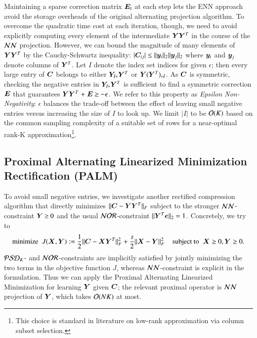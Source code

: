 Maintaining a sparse correction matrix $\bm{E}_t$ at each step lets the ENN
approach avoid the storage overheads of the original alternating projection
algorithm.  To overcome the quadratic time cost at each iteration, though, we
need to avoid explicitly computing every element of the intermediate $\bm{Y} \bm{Y}^T$
in the course of the $\mathcal{NN}$ projection. However, we can bound the magnitude of
many elements of $\bm{Y}\bm{Y}^T$ by the Cauchy-Schwartz inequality: $|\bm{C}_{ij}| \leq
\|\bm{y}_i\|_2 \|\bm{y}_j\|_2$ where $\bm{y}_i$ and $\bm{y}_j$ denote columns of $\bm{Y}^T$.
Let $I$ denote the index set indices  for given $\epsilon$; then every large entry of $\bm{C}$ belongs to
either $\bm{Y}_{I*}\bm{Y}^T$ or $\bm{Y}(\bm{Y}^T)_{*I}$. As $\bm{C}$ is symmetric, checking
the negative entries in $\bm{Y}_{I*}\bm{Y}^T$ is sufficient to find a symmetric
correction $\bm{E}$ that guarantees $\bm{Y}\bm{Y}^T \mathrel{+} \bm{E} \mathbin{\geq} -\epsilon$. We refer
to this property as \textit{Epsilon Non-Negativity}: $\epsilon$ balances the
trade-off between the effect of leaving small negative entries versus increasing
the size of $I$ to look up. We limit $|I|$ to be $\mathcal{O}(K)$ based on the
common sampling complexity of a suitable set of rows for a near\hyp{}optimal
rank\hyp{}K approximation\footnote{This choice is standard in literature on
low-rank approximation via column subset selection.}.

\subsection{Proximal Alternating Linearized Minimization Rectification (PALM)}

To avoid small negative entries, we investigate another rectified compression
algorithm that directly minimizes $\|\bm{C} - \bm{Y} \bm{Y}^T\|_F$ subject to the
stronger $\mathcal{NN}$-constraint $\bm{Y} \mathbin{\geq} 0$ and the usual $\mathcal{NOR}$-constraint $\|\bm{Y}^T
\bm{e}\|_2 \mathrel{=} 1$. Concretely, we try to
\begin{equation}
  \text{minimize} \;\; J(\bm{X}, \bm{Y}) := \frac{1}{2} \| \bm{C} - \bm{X} \bm{Y}^T \|_F^2 + 
  \frac{s}{2} \| \bm{X} - \bm{Y} \|_F^2 \;\;\;\; \text{subject to} \;\; \bm{X} \geq 0, 
  \bm{Y} \geq 0. \label{eqn:palm}
\end{equation}
$\mathcal{PSD}_K$- and $\mathcal{NOR}$-constraints are implicitly satisfied by jointly minimizing
the two terms in the objective function $J$, whereas $\mathcal{NN}$-constraint is
explicit in the formulation. Thus we can apply the Proximal Alternating
Linearized Minimization \cite{bolte2014proximal} for learning $\bm{Y}$ given $\bm{C}$;
the relevant proximal operator is $\mathcal{NN}$ projection of $\bm{Y}$, which takes $\mathcal{O}
(NK)$ at most.

